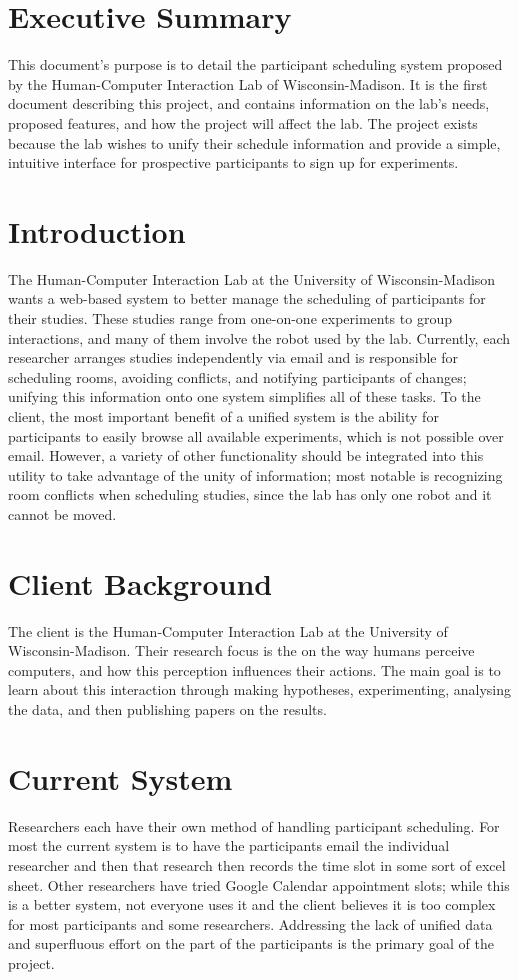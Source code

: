 \tableofcontents
\newpage

\section{Executive Summary}
This document's purpose is to detail the participant scheduling system proposed by the Human-Computer Interaction Lab of Wisconsin-Madison. It is the first document describing this project, and contains information on the lab's needs, proposed features, and how the project will affect the lab.  The project exists because the lab wishes to unify their schedule information and provide a simple, intuitive interface for prospective participants to sign up for experiments.

\section{Introduction}
The Human-Computer Interaction Lab at the University of Wisconsin-Madison wants a web-based system to better manage the scheduling of participants for their studies.  These studies range from one-on-one experiments to group interactions, and many of them involve the robot used by the lab.  Currently, each researcher arranges studies independently via email and is responsible for scheduling rooms, avoiding conflicts, and notifying participants of changes; unifying this information onto one system simplifies all of these tasks.  To the client, the most important benefit of a unified system is the ability for participants to easily browse all available experiments, which is not possible over email.  However, a variety of other functionality should be integrated into this utility to take advantage of the unity of information; most notable is recognizing room conflicts when scheduling studies, since the lab has only one robot and it cannot be moved.\cite{website:HCI}

\section{Client Background}
The client is the Human-Computer Interaction Lab at the University of Wisconsin-Madison. Their research focus is the on the way humans perceive computers, and how this perception influences their actions. The main goal is to learn about this interaction through making hypotheses, experimenting, analysing the data, and then publishing papers on the results.

\section{Current System}
Researchers each have their own method of handling participant scheduling. For most the current system is to have the participants email the individual researcher and then that research then records the time slot in some sort of excel sheet. Other researchers have tried Google Calendar appointment slots; while this is a better system, not everyone uses it and the client believes it is too complex for most participants and some researchers.  Addressing the lack of unified data and superfluous effort on the part of the participants is the primary goal of the project.


